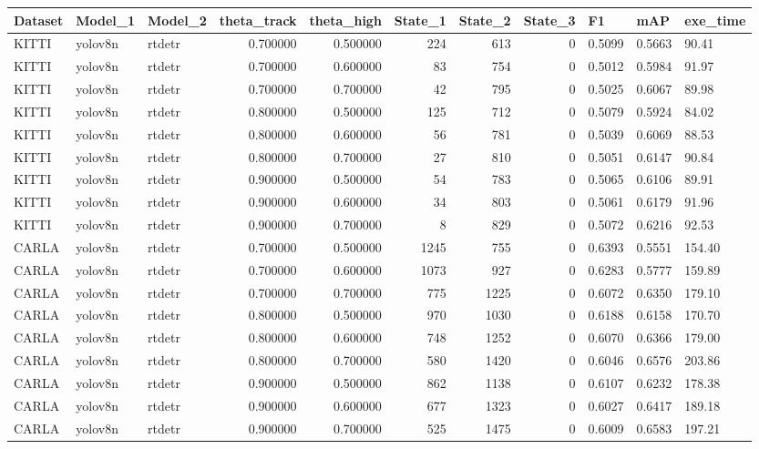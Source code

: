 \begin{tabular}{lllrrrrrlll}
\toprule
Dataset & Model_1 & Model_2 & theta_track & theta_high & State_1 & State_2 & State_3 & F1 & mAP & exe_time \\
\midrule
KITTI & yolov8n & rtdetr & 0.700000 & 0.500000 & 224 & 613 & 0 & 0.5099 & 0.5663 & 90.41 \\
KITTI & yolov8n & rtdetr & 0.700000 & 0.600000 & 83 & 754 & 0 & 0.5012 & 0.5984 & 91.97 \\
KITTI & yolov8n & rtdetr & 0.700000 & 0.700000 & 42 & 795 & 0 & 0.5025 & 0.6067 & 89.98 \\
KITTI & yolov8n & rtdetr & 0.800000 & 0.500000 & 125 & 712 & 0 & 0.5079 & 0.5924 & 84.02 \\
KITTI & yolov8n & rtdetr & 0.800000 & 0.600000 & 56 & 781 & 0 & 0.5039 & 0.6069 & 88.53 \\
KITTI & yolov8n & rtdetr & 0.800000 & 0.700000 & 27 & 810 & 0 & 0.5051 & 0.6147 & 90.84 \\
KITTI & yolov8n & rtdetr & 0.900000 & 0.500000 & 54 & 783 & 0 & 0.5065 & 0.6106 & 89.91 \\
KITTI & yolov8n & rtdetr & 0.900000 & 0.600000 & 34 & 803 & 0 & 0.5061 & 0.6179 & 91.96 \\
KITTI & yolov8n & rtdetr & 0.900000 & 0.700000 & 8 & 829 & 0 & 0.5072 & 0.6216 & 92.53 \\
CARLA & yolov8n & rtdetr & 0.700000 & 0.500000 & 1245 & 755 & 0 & 0.6393 & 0.5551 & 154.40 \\
CARLA & yolov8n & rtdetr & 0.700000 & 0.600000 & 1073 & 927 & 0 & 0.6283 & 0.5777 & 159.89 \\
CARLA & yolov8n & rtdetr & 0.700000 & 0.700000 & 775 & 1225 & 0 & 0.6072 & 0.6350 & 179.10 \\
CARLA & yolov8n & rtdetr & 0.800000 & 0.500000 & 970 & 1030 & 0 & 0.6188 & 0.6158 & 170.70 \\
CARLA & yolov8n & rtdetr & 0.800000 & 0.600000 & 748 & 1252 & 0 & 0.6070 & 0.6366 & 179.00 \\
CARLA & yolov8n & rtdetr & 0.800000 & 0.700000 & 580 & 1420 & 0 & 0.6046 & 0.6576 & 203.86 \\
CARLA & yolov8n & rtdetr & 0.900000 & 0.500000 & 862 & 1138 & 0 & 0.6107 & 0.6232 & 178.38 \\
CARLA & yolov8n & rtdetr & 0.900000 & 0.600000 & 677 & 1323 & 0 & 0.6027 & 0.6417 & 189.18 \\
CARLA & yolov8n & rtdetr & 0.900000 & 0.700000 & 525 & 1475 & 0 & 0.6009 & 0.6583 & 197.21 \\

\end{tabular}
